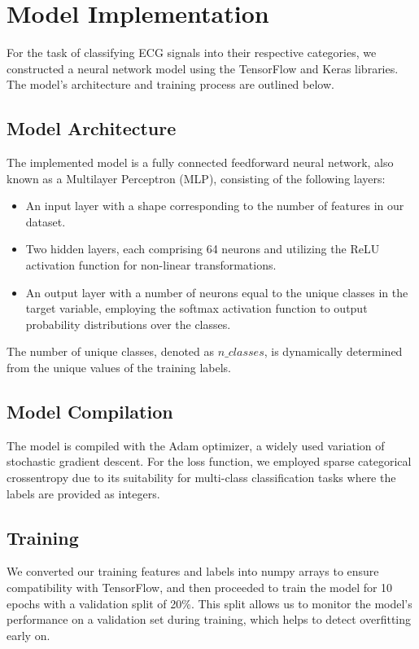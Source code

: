 \documentclass{report}
\begin{document}
\section{Model Implementation}
For the task of classifying ECG signals into their respective categories, we constructed a neural network model using the TensorFlow and Keras libraries. The model's architecture and training process are outlined below.

\subsection{Model Architecture}
The implemented model is a fully connected feedforward neural network, also known as a Multilayer Perceptron (MLP), consisting of the following layers:

\begin{itemize}
    \item An input layer with a shape corresponding to the number of features in our dataset.
    \item Two hidden layers, each comprising 64 neurons and utilizing the ReLU activation function for non-linear transformations.
    \item An output layer with a number of neurons equal to the unique classes in the target variable, employing the softmax activation function to output probability distributions over the classes.
\end{itemize}

The number of unique classes, denoted as \( n\_classes \), is dynamically determined from the unique values of the training labels.

\subsection{Model Compilation}
The model is compiled with the Adam optimizer, a widely used variation of stochastic gradient descent. For the loss function, we employed sparse categorical crossentropy due to its suitability for multi-class classification tasks where the labels are provided as integers.

\subsection{Training}
We converted our training features and labels into numpy arrays to ensure compatibility with TensorFlow, and then proceeded to train the model for 10 epochs with a validation split of 20\%. This split allows us to monitor the model's performance on a validation set during training, which helps to detect overfitting early on.
\end{document}
